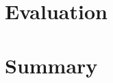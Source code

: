 \documentclass[journal]{IEEEtran}
\begin{document}
%



\section{Evaluation}


\section{Summary}

\printbibliography
\end{document}
